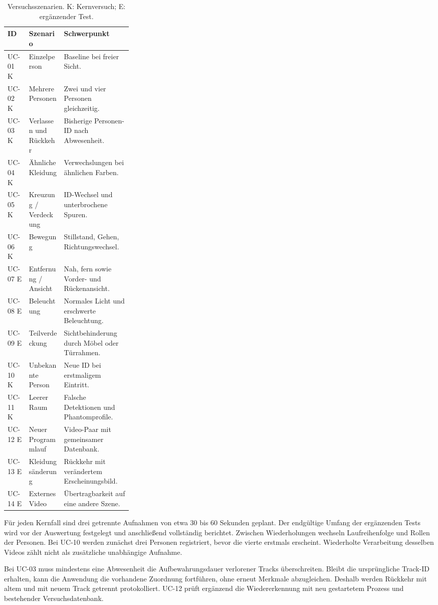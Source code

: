 \documentclass[runningheads]{llncs}
\begin{document}
\begin{table}[tbp]
\caption{Versuchsszenarien. K: Kernversuch; E: ergänzender Test.}
\label{tab:use-cases}
\centering
\small
\begin{tabularx}{\linewidth}{@{}lp{0.29\linewidth}X@{}}
\toprule
ID & Szenario & Schwerpunkt \\
\midrule
UC-01 K & Einzelperson & Baseline bei freier Sicht. \\
UC-02 K & Mehrere Personen & Zwei und vier Personen gleichzeitig. \\
UC-03 K & Verlassen und Rückkehr & Bisherige Personen-ID nach Abwesenheit. \\
UC-04 K & Ähnliche Kleidung & Verwechslungen bei ähnlichen Farben. \\
UC-05 K & Kreuzung / Verdeckung & ID-Wechsel und unterbrochene Spuren. \\
UC-06 K & Bewegung & Stillstand, Gehen, Richtungswechsel. \\
UC-07 E & Entfernung / Ansicht & Nah, fern sowie Vorder- und Rückenansicht. \\
UC-08 E & Beleuchtung & Normales Licht und erschwerte Beleuchtung. \\
UC-09 E & Teilverdeckung & Sichtbehinderung durch Möbel oder Türrahmen. \\
UC-10 K & Unbekannte Person & Neue ID bei erstmaligem Eintritt. \\
UC-11 K & Leerer Raum & Falsche Detektionen und Phantomprofile. \\
UC-12 E & Neuer Programmlauf & Video-Paar mit gemeinsamer Datenbank. \\
UC-13 E & Kleidungsänderung & Rückkehr mit verändertem Erscheinungsbild. \\
UC-14 E & Externes Video & Übertragbarkeit auf eine andere Szene. \\
\bottomrule
\end{tabularx}
\end{table}

Für jeden Kernfall sind drei getrennte Aufnahmen von etwa 30 bis 60 Sekunden geplant. Der endgültige Umfang der ergänzenden Tests wird vor der Auswertung festgelegt und anschlie{\ss}end vollständig berichtet. Zwischen Wiederholungen wechseln Laufreihenfolge und Rollen der Personen. Bei UC-10 werden zunächst drei Personen registriert, bevor die vierte erstmals erscheint. Wiederholte Verarbeitung desselben Videos zählt nicht als zusätzliche unabhängige Aufnahme.

Bei UC-03 muss mindestens eine Abwesenheit die Aufbewahrungsdauer verlorener Tracks überschreiten. Bleibt die ursprüngliche Track-ID erhalten, kann die Anwendung die vorhandene Zuordnung fortführen, ohne erneut Merkmale abzugleichen. Deshalb werden Rückkehr mit altem und mit neuem Track getrennt protokolliert. UC-12 prüft ergänzend die Wiedererkennung mit neu gestartetem Prozess und bestehender Versuchsdatenbank.
\end{document}
